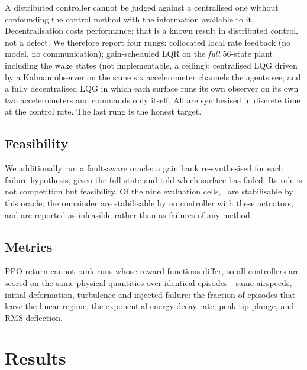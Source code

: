 \documentclass[11pt,a4paper]{article}
\begin{document}
A distributed controller cannot be judged against a centralised one without
confounding the control method with the information available to it.
Decentralisation costs performance; that is a known result in distributed control,
not a defect. We therefore report four rungs: collocated local rate feedback (no
model, no communication); gain-scheduled LQR on the \emph{full} 56-state plant
including the wake states (not implementable, a ceiling); centralised LQG driven
by a Kalman observer on the same six accelerometer channels the agents see; and a
fully decentralised LQG in which each surface runs its own observer on its own two
accelerometers and commands only itself. All are synthesised in discrete time at
the control rate. The last rung is the honest target.

\subsection{Feasibility}

We additionally run a fault-aware oracle: a gain bank re-synthesised for each
failure hypothesis, given the full state and told which surface has failed. Its
role is not competition but feasibility. Of the nine evaluation cells,
\FeasibleCells\ are stabilisable by this oracle; the remainder are stabilisable by
no controller with these actuators, and are reported as infeasible rather than as
failures of any method.

\subsection{Metrics}

PPO return cannot rank runs whose reward functions differ, so all controllers are
scored on the same physical quantities over identical episodes---same airspeeds,
initial deformation, turbulence and injected failure: the fraction of episodes
that leave the linear regime, the exponential energy decay rate, peak tip plunge,
and RMS deflection.

\section{Results}

\begin{table}[t]
\centering
\caption{Energy decay rate by controller and flight condition. Negative is
suppressed, \texttt{D} marks the fraction of episodes that diverged, and
\texttt{--} marks conditions infeasible for any controller with these actuators.}
\label{tab:main}
\footnotesize

\end{table}
\end{document}
